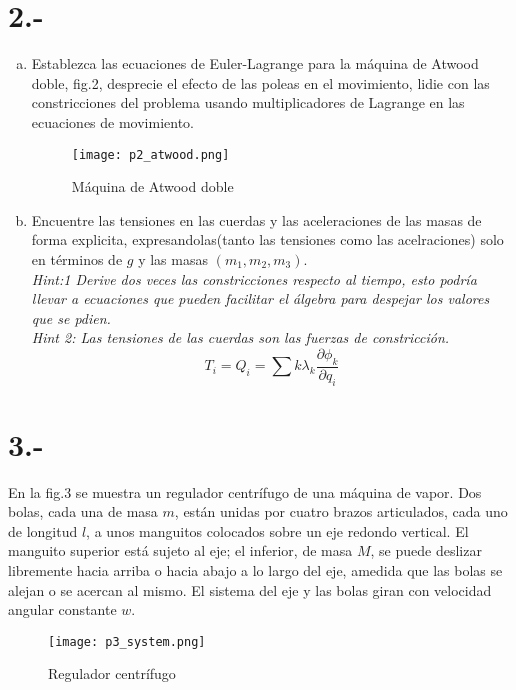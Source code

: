\documentclass{article}
\begin{document}
\section*{2.-}
\begin{enumerate}[a)]
    \item Establezca las ecuaciones de Euler-Lagrange para la máquina de Atwood doble, 
    fig.2, desprecie el efecto de las poleas en el movimiento, lidie con las constricciones del problema usando multiplicadores 
    de Lagrange en las ecuaciones de movimiento.
    \begin{figure}[H]
        \centering
        \texttt{[image: p2\_atwood.png]}
        \caption{Máquina de Atwood doble}
    \end{figure}
    \item Encuentre las tensiones en las cuerdas y las aceleraciones de las masas de forma explicita, expresandolas(tanto las tensiones como las acelraciones)
    solo en términos de $g$ y las masas $(m_1,m_2,m_3)$. \\
    \textit{Hint:1 Derive dos veces las constricciones respecto al tiempo, esto podría llevar a ecuaciones que pueden facilitar 
    el álgebra para despejar los valores que se pdien.} \\
    \textit{Hint 2: Las tensiones de las cuerdas son las fuerzas de constricción.} 
    \[ T_i = Q_i = \sum{k}\lambda_k \frac{\partial \phi_k}{\partial q_i} \]
\end{enumerate}
\begin{tcolorbox}[breakable]
    
\end{tcolorbox}

\section*{3.-}
En la fig.3 se muestra un regulador centrífugo de una máquina de vapor. Dos bolas, cada una de masa $m$, están unidas por cuatro brazos articulados, 
cada uno de longitud $l$, a unos manguitos colocados sobre un eje redondo vertical. El manguito superior está sujeto al eje; el inferior, de masa $M$, 
se puede deslizar libremente hacia arriba o hacia abajo a lo largo del eje, amedida que las bolas se alejan o se acercan al mismo. 
El sistema del eje y las bolas giran con velocidad angular constante $w$.
\begin{figure}[H]
    \centering
    \texttt{[image: p3\_system.png]}
    \caption{Regulador centrífugo}
\end{figure}
\end{document}
